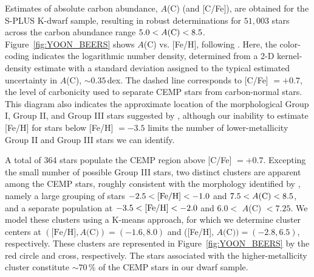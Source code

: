 \documentclass[twocolumn,trackchanges]{aastex63}
\begin{document}
Estimates of absolute carbon abundance, $A$(C) (and [C/Fe]), are obtained for the S-PLUS K-dwarf sample, resulting in robust determinations for $51,003$ stars across the carbon abundance range $5.0 < A({\rm C}) < 8.5$. Figure~\ref{fig:YOON_BEERS} shows $A$(C) vs. [Fe/H], following \citet{Yoon:2016}. Here, the color-coding indicates the logarithmic number density, determined from a 2-D kernel-density estimate with a standard deviation assigned to the typical estimated uncertainty in $A$(C), $\sim 0.35$\,dex. The dashed line corresponds to [C/Fe] $= +0.7$, the level of carbonicity used to separate CEMP stars from carbon-normal stars. %
This diagram also indicates the approximate location of the morphological Group I, Group II, and Group III stars suggested by \citet{Yoon:2016}, although our inability to estimate [Fe/H] for stars below [Fe/H] $ = -3.5$ limits the number of lower-metallicity Group II and Group III stars we can identify. 


A total of 364 stars populate the CEMP region above [C/Fe]  $=+0.7$. %
Excepting the small number of possible Group III stars, two distinct clusters are apparent among the CEMP stars, roughly consistent with the morphology identified by \citet{Yoon:2016}, namely a large grouping of stars $-2.5 <  {\rm [Fe/H]} <  -1.0$ and $7.5 <  A{\rm (C)}  < 8.5$, and a separate population at $-3.5 <  {\rm [Fe/H]} <  -2.0$ and  $6.0 < $ $A$(C) $ < 7.25$. We model these clusters using a K-means approach, for which we determine cluster centers at $(\textrm{[Fe/H]}, A\textrm{(C)}) = (-1.6, 8.0)$ and ([Fe/H], $A\textrm{(C)}) = (-2.8, 6.5)$, respectively. These clusters are represented in Figure~\ref{fig:YOON_BEERS} by the red circle and cross, respectively. The stars associated with the higher-metallicity cluster constitute $\sim 70$\,\% of the CEMP stars in our dwarf sample.
\end{document}
